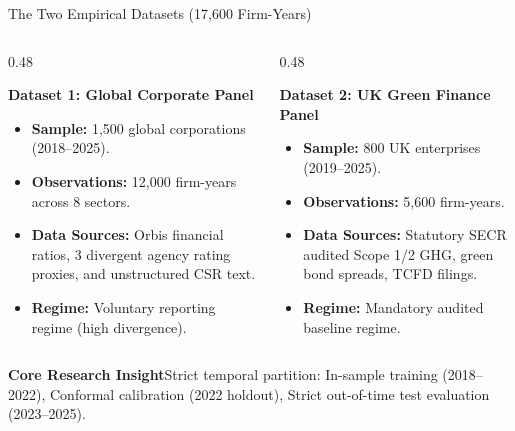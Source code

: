 \documentclass[aspectratio=169,10pt]{beamer}
\newcommand{\insight}[1]{\vspace{2pt}\begin{block}{\textbf{Core Research Insight}}#1\end{block}}
\begin{document}
\begin{frame}[t]{The Two Empirical Datasets (17,600 Firm-Years)}
\small
\begin{columns}[T]
  \begin{column}{0.48\textwidth}
    \begin{block}{\textbf{Dataset 1: Global Corporate Panel}}
      \begin{itemize}\setlength{\itemsep}{2pt}
        \item \textbf{Sample:} 1,500 global corporations (2018--2025).
        \item \textbf{Observations:} 12,000 firm-years across 8 sectors.
        \item \textbf{Data Sources:} Orbis financial ratios, 3 divergent agency rating proxies, and unstructured CSR text.
        \item \textbf{Regime:} Voluntary reporting regime (high divergence).
      \end{itemize}
    \end{block}
  \end{column}
  
  \begin{column}{0.48\textwidth}
    \begin{exampleblock}{\textbf{Dataset 2: UK Green Finance Panel}}
      \begin{itemize}\setlength{\itemsep}{2pt}
        \item \textbf{Sample:} 800 UK enterprises (2019--2025).
        \item \textbf{Observations:} 5,600 firm-years.
        \item \textbf{Data Sources:} Statutory SECR audited Scope 1/2 GHG, green bond spreads, TCFD filings.
        \item \textbf{Regime:} Mandatory audited baseline regime.
      \end{itemize}
    \end{exampleblock}
  \end{column}
\end{columns}
\vspace{4pt}
\insight{Strict temporal partition: In-sample training (2018--2022), Conformal calibration (2022 holdout), Strict out-of-time test evaluation (2023--2025).}
\end{frame}
\end{document}
